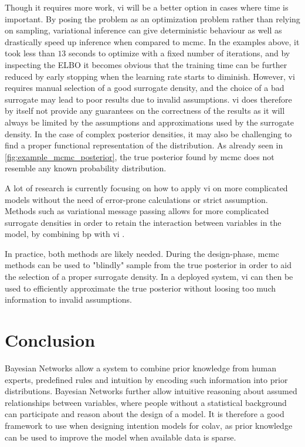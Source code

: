 Though it requires more work, \acrshort{vi} will be a better option in cases where time is important. By posing the problem as an optimization problem rather than relying on sampling, variational inference can give deterministic behaviour as well as drastically speed up inference when compared to \acrshort{mcmc}. In the examples above, it took less than $13$ seconds to optimize with a fixed number of iterations, and by inspecting the ELBO it becomes obvious that the training time can be further reduced by early stopping when the learning rate starts to diminish. 
However, \acrshort{vi} requires manual selection of a good surrogate density, and the choice of a bad surrogate may lead to poor results due to invalid assumptions. \acrshort{vi} does therefore by itself not provide any guarantees on the correctness of the results as it will always be limited by the assumptions and approximations used by the surrogate density. In the case of complex posterior densities, it may also be challenging to find a proper functional representation of the distribution. As already seen in \cref{fig:example_mcmc_posterior}, the true posterior found by \acrshort{mcmc} does not resemble any known probability distribution. 

A lot of research is currently focusing on how to apply \acrshort{vi} on more complicated models without the need of error-prone calculations or strict assumption. Methods such as variational message passing allows for more complicated surrogate densities in order to retain the interaction between variables in the model, by combining \acrshort{bp} with \acrshort{vi} \cite{winnbishop}. 

In practice, both methods are likely needed. During the design-phase, \acrshort{mcmc} methods can be used to "blindly" sample from the true posterior in order to aid the selection of a proper surrogate density. In a deployed system, \acrshort{vi} can then be used to efficiently approximate the true posterior without loosing too much information to invalid assumptions.

\section{Conclusion}
Bayesian Networks allow a system to combine prior knowledge from human experts, predefined rules and intuition by encoding such information into prior distributions. Bayesian Networks further allow intuitive reasoning about assumed relationships between variables, where people without a statistical background can participate and reason about the design of a model. It is therefore a good framework to use when designing intention models for \acrshort{colav}, as prior knowledge can be used to improve the model when available data is sparse.

